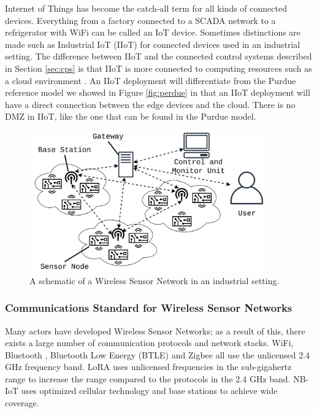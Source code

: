 Internet of Things has become the catch-all term for all kinds of connected devices. Everything from a factory connected to a SCADA network to a refrigerator with WiFi can be called an IoT device. Sometimes distinctions are made such as Industrial IoT (IIoT) for connected devices used in an industrial setting. The difference between IIoT and the connected control systems described in Section \ref{sec:cps} is that IIoT is more connected to computing resources such as a cloud environment \cite{mclaughlin2016undiscovered}. An IIoT deployment will differentiate from the Purdue reference model we showed in Figure \ref{fig:perdue} in that an IIoT deployment will have a direct connection between the edge devices and the cloud. There is no DMZ in IIoT, like the one that can be found in the Purdue model.


\begin{figure}[h]
\centering
\includegraphics[width=0.9\textwidth]{images/WSN.png}
\caption{A schematic of a Wireless Sensor Network in an industrial setting.}
\label{fig:wsn}
\end{figure}

\subsubsection{Communications Standard for Wireless Sensor Networks}
Many actors have developed Wireless Sensor Networks; as a result of this, there exists a large number of communication protocols and network stacks. WiFi, Bluetooth \cite{haartsen2000bluetooth}, Bluetooth Low Energy (BTLE) \cite{heydon2012bluetooth} and Zigbee \cite{alliance2010zigbee} all use the unlicensed 2.4 GHz frequency band. LoRA \cite{sornin2015lora} uses unlicensed frequencies in the sub-gigahertz range to increase the range compared to the protocols in the 2.4 GHz band. NB-IoT\cite{ratasuk2016nb} uses optimized cellular technology and base stations to achieve wide coverage.


